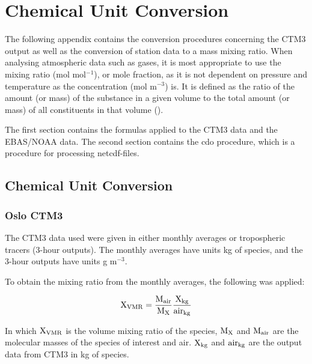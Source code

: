 

\cleardoublepage

\chapter{Chemical Unit Conversion}

The following appendix contains the conversion procedures concerning the CTM3 output as well as the conversion of station data to a mass mixing ratio. When analysing atmospheric data such as gases, it is most appropriate to use the mixing ratio (mol mol$^{-1}$), or mole fraction, as it is not dependent on pressure and temperature as the concentration (mol m$^{-3}$) is. It is defined as the ratio of the amount (or mass) of the substance in a given volume to the total amount (or mass) of all constituents in that volume (\cite{SeinfeldSpyros}). 

\medskip

The first section contains the formulas applied to the CTM3 data and the EBAS/NOAA data. The second section contains the \acrfull{cdo} procedure, which is a procedure for processing \acrshort{netcdf}-files. 

\section{Chemical Unit Conversion}

\subsection{Oslo CTM3}\label{sec:unit_conversion_CTM3}

The CTM3 data used were given in either monthly averages or tropospheric tracers (3-hour outputs). The monthly averages have units kg of species, and the 3-hour outputs have units g m$^{-3}$. 

\medskip

To obtain the mixing ratio from the monthly averages, the following was applied:

\begin{equation}
    \mathrm{X_{VMR}} = \frac{\mathrm{M_{air}}}{\mathrm{M_{X}}}\frac{\mathrm{X_{kg}}}{\mathrm{air_{kg}}}
    \label{eq:vmr_monthly_avg}
\end{equation}

In which $\mathrm{X_{VMR}}$ is the volume mixing ratio of the species, $\mathrm{M_X}$ and $\mathrm{M_{air}}$ are the molecular masses of the species of interest and air. $\mathrm{X_{kg}}$ and $\mathrm{air_{kg}}$ are the output data from CTM3 in kg of species. 

